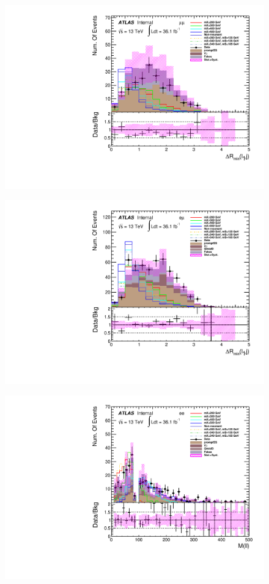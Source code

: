 \begin{figure}[h]
\begin{minipage}[t]{0.33\linewidth}
 \includegraphics[width=1.0\textwidth]{fig/dataMC_high_Njet_CR/mindR_l1j_mumu.pdf}\label{fig:dataMC_high_Njet_CR:mindRl1j_mumu.pdf}
 \end{minipage}
  \begin{minipage}[t]{0.33\linewidth}
 \centering
 \includegraphics[width=1.0\textwidth]{fig/dataMC_high_Njet_CR/mindR_l1j_emu.pdf}\label{fig:dataMC_high_Njet_CR:mindRl1j_emu.pdf}
 \end{minipage}
\begin{minipage}[t]{0.33\linewidth}
 \centering
 \includegraphics[width=1.0\textwidth]{fig/dataMC_high_Njet_CR/m_ll_ee.pdf}

\end{minipage}
\end{figure}
